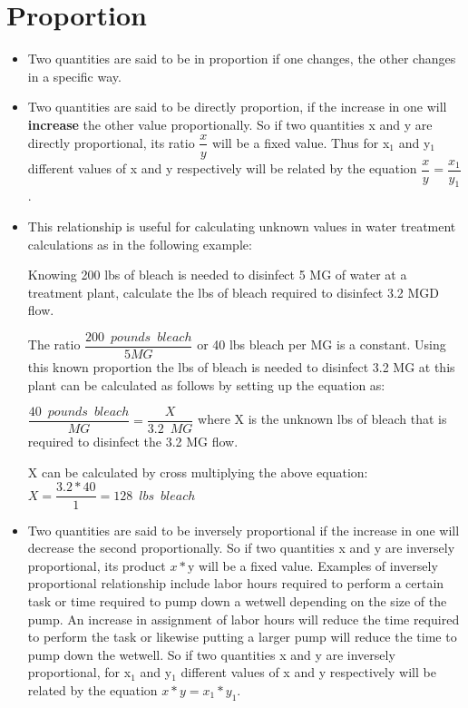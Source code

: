 \section{Proportion}
\begin{itemize}
\item Two quantities are said to be in proportion if one changes, the other changes in a specific way.
\item Two quantities are said to be directly proportion, if the increase in one will \textbf{increase} the other value proportionally.  So if two quantities x and y are directly proportional, its ratio $\dfrac{x}{y}$ will be a fixed value. Thus for x$_1$ and y$_1$ different values of x and y respectively will be related by the equation $\dfrac{x}{y}=\dfrac{x_1}{y_1}$.  

\item This relationship is useful for calculating unknown values in water treatment calculations as in the following example: 

Knowing 200 lbs of bleach is needed to disinfect 5 MG of water at a treatment plant, calculate the lbs of bleach required to disinfect 3.2 MGD flow.

The ratio $\dfrac{200 \enspace pounds \enspace bleach}{5 MG}$ or 40 lbs bleach per MG is a constant.  Using this known proportion the lbs of bleach is needed to disinfect 3.2 MG at this plant can be calculated as follows by setting up the equation as:

$\dfrac{40 \enspace pounds \enspace bleach}{MG}=\dfrac{X}{3.2 \enspace MG}$ where X is the unknown lbs of bleach that is required to disinfect the 3.2 MG flow.

X can be calculated by cross multiplying the above equation: $X=\dfrac{3.2*40}{1}=128 \enspace lbs \enspace bleach$

\item Two quantities are said to be inversely proportional if the increase in one will decrease the second proportionally.  So if two quantities x and y are inversely proportional, its product $x * \text{y}$ will be a fixed value.  Examples of inversely proportional relationship include labor hours required to perform a certain task or time required to pump down a wetwell depending on the size of the pump.  An increase in assignment of labor hours will reduce the time required to perform the task or likewise putting a larger pump will reduce the time to pump down the wetwell.  So if two quantities x and y are inversely proportional, for x$_1$ and y$_1$ different values of x and y respectively will be related by the equation $x *y = x_1 * y_1$.


\end{itemize}
